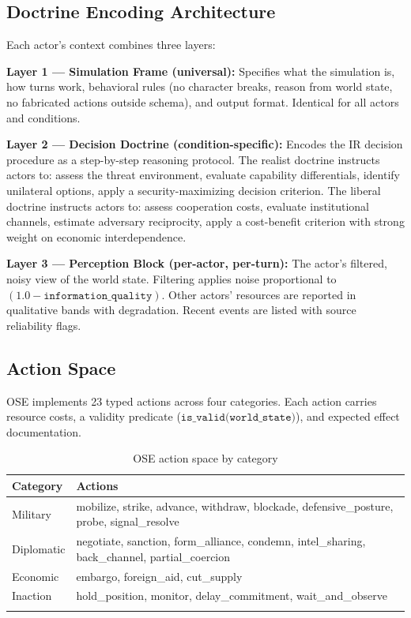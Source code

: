 \documentclass[12pt, a4paper]{article}
\begin{document}
\subsection{Doctrine Encoding Architecture}

Each actor's context combines three layers:

\textbf{Layer 1 --- Simulation Frame (universal):} Specifies what the simulation is, how turns work, behavioral rules (no character breaks, reason from world state, no fabricated actions outside schema), and output format. Identical for all actors and conditions.

\textbf{Layer 2 --- Decision Doctrine (condition-specific):} Encodes the IR decision procedure as a step-by-step reasoning protocol. The realist doctrine instructs actors to: assess the threat environment, evaluate capability differentials, identify unilateral options, apply a security-maximizing decision criterion. The liberal doctrine instructs actors to: assess cooperation costs, evaluate institutional channels, estimate adversary reciprocity, apply a cost-benefit criterion with strong weight on economic interdependence.

\textbf{Layer 3 --- Perception Block (per-actor, per-turn):} The actor's filtered, noisy view of the world state. Filtering applies noise proportional to $(1.0 - \texttt{information\_quality})$. Other actors' resources are reported in qualitative bands with degradation. Recent events are listed with source reliability flags.

\subsection{Action Space}

OSE implements 23 typed actions across four categories. Each action carries resource costs, a validity predicate ($\texttt{is\_valid(world\_state)}$), and expected effect documentation.

\begin{longtable}{p{3cm} p{9cm}}
\toprule
\textbf{Category} & \textbf{Actions} \\
\midrule
Military & mobilize, strike, advance, withdraw, blockade, defensive\_posture, probe, signal\_resolve \\
Diplomatic & negotiate, sanction, form\_alliance, condemn, intel\_sharing, back\_channel, partial\_coercion \\
Economic & embargo, foreign\_aid, cut\_supply \\
Inaction & hold\_position, monitor, delay\_commitment, wait\_and\_observe \\
\bottomrule
\caption{OSE action space by category}
\end{longtable}
\end{document}

